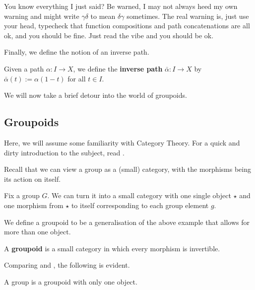 \begin{boxwarning}
    You know everything I just said? Be warned, I may not always heed my own warning and might write $\gamma \delta$ to mean $\delta \gamma$ sometimes. The real warning is, just use your head, typecheck that function compositions and path concatenations are all ok, and you should be fine. Just read the vibe and you should be ok.
\end{boxwarning}

Finally, we define the notion of an inverse path.

\begin{boxdefinition}
    Given a path $\alpha : I \to X$, we define the \textbf{inverse path} $\bar{\alpha} : I \to X$ by $\bar{\alpha}(t) := \alpha(1 - t)$ for all $t \in I$.
\end{boxdefinition}

We will now take a brief detour into the world of groupoids.

\subsection{Groupoids}

Here, we will assume some familiarity with Category Theory. For a quick and dirty introduction to the subject, read \sorry.

Recall that we can view a group as a (small) category, with the morphisms being its action on itself.

\begin{boxexample}\label{Ch1:Eg:Group_as_Category}
    Fix a group $G$. We can turn it into a small category with one single object $\star$ and one morphism from $\star$ to itself corresponding to each group element $g$.
\end{boxexample}

We define a groupoid to be a generalisation of the above example that allows for more than one object.

\begin{boxdefinition}[Groupoid]\label{Ch1:Def:Groupoid}
    A \textbf{groupoid} is a small category in which every morphism is invertible.
\end{boxdefinition}

Comparing  and , the following is evident.

\begin{boxproposition}
    A group is a groupoid with only one object.
\end{boxproposition}

